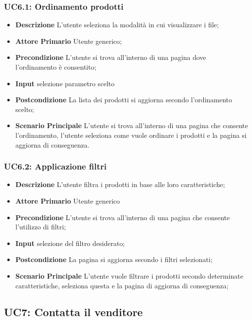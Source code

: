         \subsubsection{UC6.1: Ordinamento prodotti}
        \begin{itemize}
            \item \textbf{Descrizione} L'utente seleziona la modalità in cui visualizzare i file;
            \item \textbf{Attore Primario} Utente generico;
            \item \textbf{Precondizione} L'utente si trova all'interno di una pagina dove l'ordinamento è consentito;
            \item \textbf{Input} selezione parametro scelto
            \item \textbf{Postcondizione} La lista dei prodotti si aggiorna secondo l'ordinamento scelto;
            \item \textbf{Scenario Principale} L'utente si trova all'interno di una pagina che consente l'ordinamento, l'utente seleziona come vuole ordinare i prodotti e la pagina si aggiorna di conseguenza.
        \end{itemize}
        \subsubsection{UC6.2: Applicazione filtri}
        \begin{itemize}
            \item \textbf{Descrizione} L'utente filtra i prodotti in base alle loro caratteristiche;
            \item \textbf{Attore Primario} Utente generico
            \item \textbf{Precondizione} L'utente si trova all'interno di una pagina che consente l'utilizzo di filtri;
            \item \textbf{Input} selezione del filtro desiderato;
            \item \textbf{Postcondizione} La pagina si aggiorna secondo i filtri selezionati;
            \item \textbf{Scenario Principale} L'utente vuole filtrare i prodotti secondo determinate caratteristiche, seleziona questa e la pagina di aggiorna di conseguenza;
        \end{itemize}
        \subsection{UC7: Contatta il venditore}
